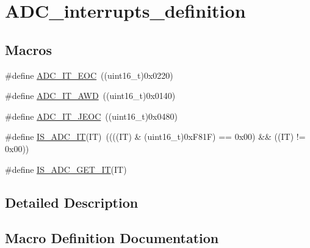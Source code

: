 \hypertarget{group___a_d_c__interrupts__definition}{}\section{A\+D\+C\+\_\+interrupts\+\_\+definition}
\label{group___a_d_c__interrupts__definition}
\subsection*{Macros}
\begin{DoxyCompactItemize}
\item 
\#define \mbox{\hyperlink{group___a_d_c__interrupts__definition_ga0ad335d835f54415194d448019569e00}{A\+D\+C\+\_\+\+I\+T\+\_\+\+E\+OC}}~((uint16\+\_\+t)0x0220)
\item 
\#define \mbox{\hyperlink{group___a_d_c__interrupts__definition_ga2f5c7f9900c24250a0c6ccaa7cbca946}{A\+D\+C\+\_\+\+I\+T\+\_\+\+A\+WD}}~((uint16\+\_\+t)0x0140)
\item 
\#define \mbox{\hyperlink{group___a_d_c__interrupts__definition_gad439fc0cd69706704d47aeabfeddb631}{A\+D\+C\+\_\+\+I\+T\+\_\+\+J\+E\+OC}}~((uint16\+\_\+t)0x0480)
\item 
\#define \mbox{\hyperlink{group___a_d_c__interrupts__definition_gaf5f8d35930becff402eeb8220641432f}{I\+S\+\_\+\+A\+D\+C\+\_\+\+IT}}(IT)~((((IT) \& (uint16\+\_\+t)0x\+F81\+F) == 0x00) \&\& ((\+I\+T) != 0x00))
\item 
\#define \mbox{\hyperlink{group___a_d_c__interrupts__definition_gacae69f04de1a0033f065864d868c006e}{I\+S\+\_\+\+A\+D\+C\+\_\+\+G\+E\+T\+\_\+\+IT}}(IT)
\end{DoxyCompactItemize}


\subsection{Detailed Description}


\subsection{Macro Definition Documentation}
\mbox{\label{group___a_d_c__interrupts__definition_ga2f5c7f9900c24250a0c6ccaa7cbca946}} 
